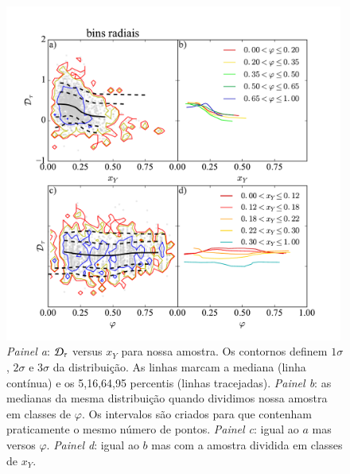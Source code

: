 \begin{figure}
	\centering
	\includegraphics[width=0.99\textwidth]{figuras/DtauR.pdf}
	\caption[$\Dtau$, $x_Y$ e $\varphi$.]
	{\emph{Painel a}: $\Dtau$ versus $x_Y$ para nossa amostra. Os contornos definem
$1\sigma$, $2\sigma$ e $3\sigma$ da distribuição. As linhas marcam a mediana (linha contínua) e os
5,16,64,95 percentis (linhas tracejadas). \emph{Painel b}: as medianas da mesma distribuição
quando dividimos nossa amostra em classes de $\varphi$. Os intervalos são criados para que contenham
praticamente o mesmo número de pontos. \emph{Painel c}: igual ao $a$ mas versos
$\varphi$. \emph{Painel d}: igual ao $b$ mas com a amostra dividida em classes de $x_Y$.}
	\label{fig:Dtau}
\end{figure}

